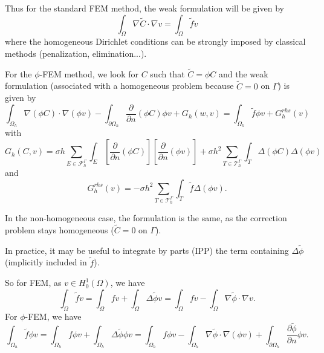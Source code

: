 Thus for the standard FEM method, the weak formulation will be given by
\begin{equation*}
	\int_\Omega \nabla\tilde{C}\cdot\nabla v=\int_\Omega \tilde{f}v
\end{equation*}
where the homogeneous Dirichlet conditions can be strongly imposed by classical methods (penalization, elimination...).

For the $\phi$-FEM method, we look for $C$ such that $\tilde{C}=\phi C$ and the weak formulation (associated with a homogeneous problem because $\tilde{C}=0$ on $\Gamma$) is given by
\begin{equation*}
	\int_{\Omega_h} \nabla (\phi C) \cdot \nabla (\phi v) - \int_{\partial\Omega_h} \frac{\partial}{\partial n}(\phi C)\phi v+G_h(w,v)=\int_{\Omega_h} \tilde{f} \phi v + G_h^{rhs}(v)
\end{equation*}
with
\begin{equation*}
	G_h(C,v)=\sigma h\sum_{E\in\mathcal{F}_h^\Gamma} \int_E \left[\frac{\partial}{\partial n}(\phi C)\right] \left[\frac{\partial}{\partial n}(\phi v)\right]+\sigma h^2\sum_{T\in\mathcal{T}_h^\Gamma} \int_{T} \Delta(\phi C)\Delta(\phi v)
\end{equation*}
and
\begin{equation*}
	G_h^{rhs}(v)=-\sigma h^2\sum_{T\in\mathcal{T}_h^\Gamma} \int_{T} \tilde{f} \Delta(\phi v).
\end{equation*}

In the non-homogeneous case, the formulation is the same, as the correction problem stays homogeneous ($\tilde{C}=0$ on $\Gamma$).

\begin{Rem}
	In practice, it may be useful to integrate by parts (IPP) the term containing $\Delta \tilde{\phi}$ (implicitly included in $\tilde{f}$).
	
	So for FEM, as $v\in H_0^1(\Omega)$, we have
	\begin{equation*}
		\int_\Omega \tilde{f}v=\int_\Omega fv+\int_\Omega \Delta\tilde{\phi}v=\int_\Omega fv-\int_\Omega \nabla\tilde{\phi}\cdot\nabla v.
	\end{equation*}
	For $\phi$-FEM, we have
	\begin{equation*}
		\int_{\Omega_h} \tilde{f} \phi v=\int_{\Omega_h} f \phi v+\int_{\Omega_h} \Delta\tilde{\phi} \phi v=\int_{\Omega_h} f \phi v-\int_{\Omega_h} \nabla\tilde{\phi}\cdot\nabla(\phi v)+\int_{\partial\Omega_h} \frac{\partial\tilde{\phi}}{\partial n}\phi v.
	\end{equation*}
\end{Rem}

